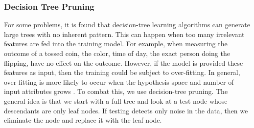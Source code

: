 	\subsubsection{Decision Tree Pruning}
		For some problems, it is found that decision-tree learning algorithms can generate large trees with no inherent pattern. This can happen when too many irrelevant features are fed into the training model. 
		For example, when measuring the outcome of a tossed coin, the color, time of day, the exact person doing the flipping, have no effect on the outcome. 
		However, if the model is provided these features as input, then the training could be subject to over-fitting. 
		In general, over-fitting is more likely to occur when the hypothesis space and number of input attributes grows \cite{russell2010artificial}. 
		To combat this, we use decision-tree pruning. 
		The general idea is that we start with a full tree and look at a test node whose descendants are only leaf nodes. 
		If testing detects only noise in the data, then we eliminate the node and replace it with the leaf node. 
	